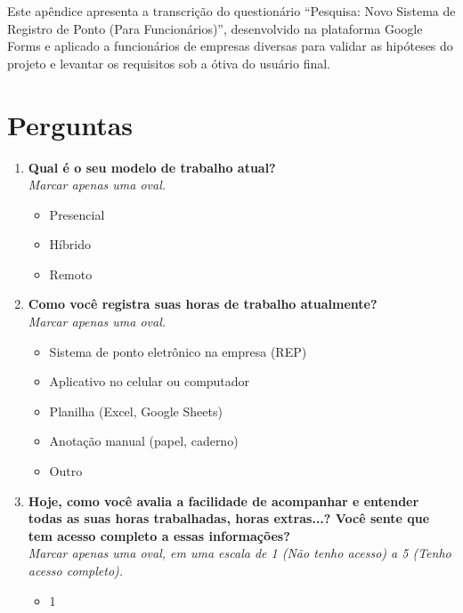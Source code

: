\begin{apendicesenv}
Este apêndice apresenta a transcrição do questionário ``Pesquisa: Novo Sistema de Registro de Ponto (Para Funcionários)'', desenvolvido na plataforma Google Forms e aplicado a funcionários de empresas diversas para validar as hipóteses do projeto e levantar os requisitos sob a ótiva do usuário final.

\section*{Perguntas}
\begin{enumerate}
  \item \textbf{Qual é o seu modelo de trabalho atual?} \\
        \textit{Marcar apenas uma oval.}
        \begin{itemize}
          \item Presencial
          \item Híbrido
          \item Remoto
        \end{itemize}

  \item \textbf{Como você registra suas horas de trabalho atualmente?} \\
        \textit{Marcar apenas uma oval.}
        \begin{itemize}
          \item Sistema de ponto eletrônico na empresa (REP)
          \item Aplicativo no celular ou computador
          \item Planilha (Excel, Google Sheets)
          \item Anotação manual (papel, caderno)
          \item Outro
        \end{itemize}

  \item \textbf{Hoje, como você avalia a facilidade de acompanhar e entender todas as suas horas trabalhadas, horas extras...? Você sente que tem acesso completo a essas informações?} \\
        \textit{Marcar apenas uma oval, em uma escala de 1 (Não tenho acesso) a 5 (Tenho acesso completo).}
        \begin{itemize}
          \item 1    
        \end{itemize}


\end{enumerate}
\end{apendicesenv}

